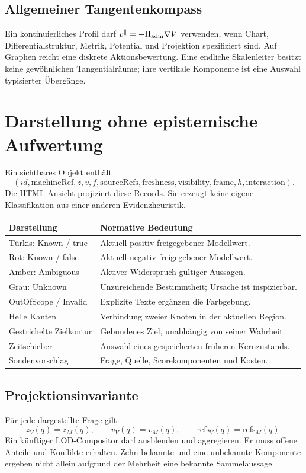 \documentclass[11pt,a4paper]{article}
\newcommand{\nextsection}[2]{\clearpage{\color{accent}\small\textsf{#1}}\section{#2}}
\begin{document}
\subsection{Allgemeiner Tangentenkompass}
Ein kontinuierliches Profil darf
$v^\parallel=-\Pi_{\rm adm}\nabla V$ verwenden, wenn Chart,
Differentialstruktur, Metrik, Potential und Projektion spezifiziert sind.
Auf Graphen reicht eine diskrete Aktionsbewertung. Eine endliche
Skalenleiter besitzt keine gewöhnlichen Tangentialräume;
ihre vertikale Komponente ist eine Auswahl typisierter Übergänge.

\nextsection{10 / HUMANVIEW}{Darstellung ohne epistemische Aufwertung}
Ein sichtbares Objekt enthält
\[
(id,\mathrm{machineRef},z,v,f,\mathrm{sourceRefs},
\mathrm{freshness},\mathrm{visibility},\mathrm{frame},h,\mathrm{interaction}).
\]
Die HTML-Ansicht projiziert diese Records. Sie erzeugt keine eigene
Klassifikation aus einer anderen Evidenzheuristik.

\begin{tabularx}{\linewidth}{@{}lY@{}}
\toprule
Darstellung & Normative Bedeutung\\\midrule
Türkis: Known / true & Aktuell positiv freigegebener Modellwert.\\
Rot: Known / false & Aktuell negativ freigegebener Modellwert.\\
Amber: Ambiguous & Aktiver Widerspruch gültiger Aussagen.\\
Grau: Unknown & Unzureichende Bestimmtheit; Ursache ist inspizierbar.\\
OutOfScope / Invalid & Explizite Texte ergänzen die Farbgebung.\\
Helle Kanten & Verbindung zweier Knoten in der aktuellen Region.\\
Gestrichelte Zielkontur & Gebundenes Ziel, unabhängig von seiner Wahrheit.\\
Zeitschieber & Auswahl eines gespeicherten früheren Kernzustands.\\
Sondenvorschlag & Frage, Quelle, Scorekomponenten und Kosten.\\
\bottomrule
\end{tabularx}

\subsection{Projektionsinvariante}
Für jede dargestellte Frage gilt
\[
z_V(q)=z_M(q),\qquad v_V(q)=v_M(q),\qquad
\mathrm{refs}_V(q)=\mathrm{refs}_M(q).
\]
Ein künftiger LOD-Compositor darf ausblenden und aggregieren.
Er muss offene Anteile und Konflikte erhalten. Zehn bekannte und
eine unbekannte Komponente ergeben nicht allein aufgrund der
Mehrheit eine bekannte Sammelaussage.
\end{document}
